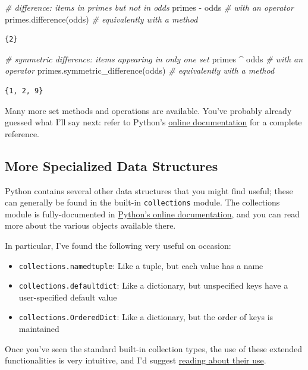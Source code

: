 \documentclass[]{article}
\newenvironment{Shaded}{}{}
\newcommand{\CommentTok}[1]{\textcolor[rgb]{0.38,0.63,0.69}{\textit{{#1}}}}
\newcommand{\OperatorTok}[1]{\textcolor[rgb]{0.40,0.40,0.40}{{#1}}}
\newcommand{\NormalTok}[1]{{#1}}
\providecommand{\tightlist}{%
  \setlength{\itemsep}{0pt}\setlength{\parskip}{0pt}}
\begin{document}
\begin{Shaded}
\begin{Highlighting}[]
\CommentTok{# difference: items in primes but not in odds}
\NormalTok{primes }\OperatorTok{-} \NormalTok{odds           }\CommentTok{# with an operator}
\NormalTok{primes.difference(odds) }\CommentTok{# equivalently with a method}
\end{Highlighting}
\end{Shaded}

\begin{verbatim}
{2}
\end{verbatim}

\begin{Shaded}
\begin{Highlighting}[]
\CommentTok{# symmetric difference: items appearing in only one set}
\NormalTok{primes }\OperatorTok{^} \NormalTok{odds                     }\CommentTok{# with an operator}
\NormalTok{primes.symmetric_difference(odds) }\CommentTok{# equivalently with a method}
\end{Highlighting}
\end{Shaded}

\begin{verbatim}
{1, 2, 9}
\end{verbatim}

Many more set methods and operations are available. You've probably
already guessed what I'll say next: refer to Python's
\href{https://docs.python.org/3/library/stdtypes.html}{online
documentation} for a complete reference.

\subsection{More Specialized Data
Structures}\label{more-specialized-data-structures}

Python contains several other data structures that you might find
useful; these can generally be found in the built-in
\texttt{collections} module. The collections module is fully-documented
in \href{https://docs.python.org/3/library/collections.html}{Python's
online documentation}, and you can read more about the various objects
available there.

In particular, I've found the following very useful on occasion:

\begin{itemize}
\tightlist
\item
  \texttt{collections.namedtuple}: Like a tuple, but each value has a
  name
\item
  \texttt{collections.defaultdict}: Like a dictionary, but unspecified
  keys have a user-specified default value
\item
  \texttt{collections.OrderedDict}: Like a dictionary, but the order of
  keys is maintained
\end{itemize}

Once you've seen the standard built-in collection types, the use of
these extended functionalities is very intuitive, and I'd suggest
\href{https://docs.python.org/3/library/collections.html}{reading about
their use}.
\end{document}
